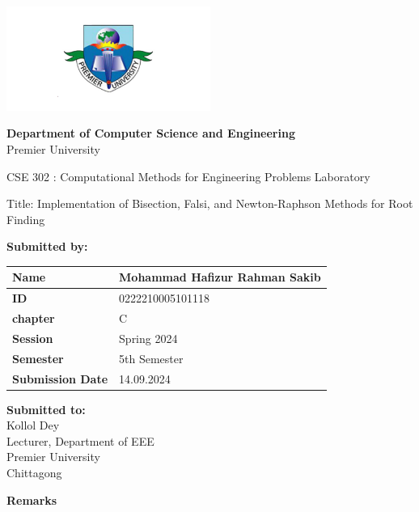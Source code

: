 \documentclass{scrreprt}
\renewcommand{\arraystretch}{1.5}
\begin{document}
\begin{titlepage}
    \centering
    \includegraphics[width=0.5\textwidth]{./logo.png} 
    \vspace{1cm}

    \textbf{Department of Computer Science and Engineering}\\
    Premier University
    \vspace{1cm}

     \large \textnormal{CSE 302 : Computational Methods for Engineering 
    Problems Laboratory }
    \vspace{1in} 

    \Large \textnormal{Title: Implementation of Bisection, Falsi, and Newton-Raphson Methods for Root Finding}
    \vspace{0.5in} 

    \large
    \textbf{Submitted by:}
    \vspace{0.5cm}

    \renewcommand{\arraystretch}{1.5} 
    \begin{tabular}{|p{}|p{}|}
        \hline
        \textbf{Name} & Mohammad Hafizur Rahman Sakib \\
        \hline
        \textbf{ID} & 0222210005101118 \\
        \hline
        \textbf{chapter} & C \\
        \hline
        \textbf{Session} & Spring 2024 \\
        \hline
        \textbf{Semester} & 5th Semester \\
        \hline
        \textbf{Submission Date} & 14.09.2024 \\
        \hline
    \end{tabular}
    \vspace{1cm}

    \begin{minipage}[t]{0.48\textwidth}
        \textbf{Submitted to:}\\
        Kollol Dey\\
        Lecturer, Department of EEE\\
        Premier University\\
        Chittagong
    \end{minipage}%
    \hfill
    \begin{minipage}[t]{0.48\textwidth}
        \raggedleft
        \textbf{Remarks}\\
        \vspace{0.5cm} %
    \end{minipage}


\end{titlepage}
\end{document}

